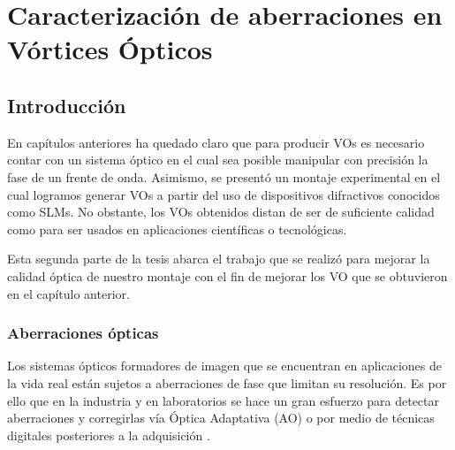 

\chapter{Caracterización de aberraciones en Vórtices Ópticos}
\label{cha:Car_intro}
\graphicspath{{Figures/chPD_img/}{../Figures/chPD_img/}}
\section{Introducción}
En capítulos anteriores ha quedado claro que para producir \acrshort{VOs} es
necesario contar con un sistema óptico en el cual sea posible
manipular con precisión la fase de un frente de onda.  Asimismo, se
presentó un montaje experimental en el cual logramos generar VOs a
partir del uso de dispositivos difractivos conocidos como SLMs. 
No obstante, los VOs obtenidos distan de ser de suficiente calidad como
para ser usados en aplicaciones científicas o tecnológicas. 

Esta segunda parte de la tesis abarca el trabajo que se realizó para
mejorar la calidad óptica de nuestro montaje con el fin de mejorar los
VO que se obtuvieron en el capítulo anterior. 

\subsection{Aberraciones ópticas}
Los sistemas ópticos formadores de imagen que se encuentran en
aplicaciones de la vida real están sujetos a aberraciones de fase que
limitan su resolución. Es por ello que en la industria y en laboratorios se hace un gran esfuerzo para
detectar aberraciones y corregirlas vía Óptica Adaptativa (\acrshort{AO})  o por
medio de técnicas digitales posteriores a la adquisición
. 

